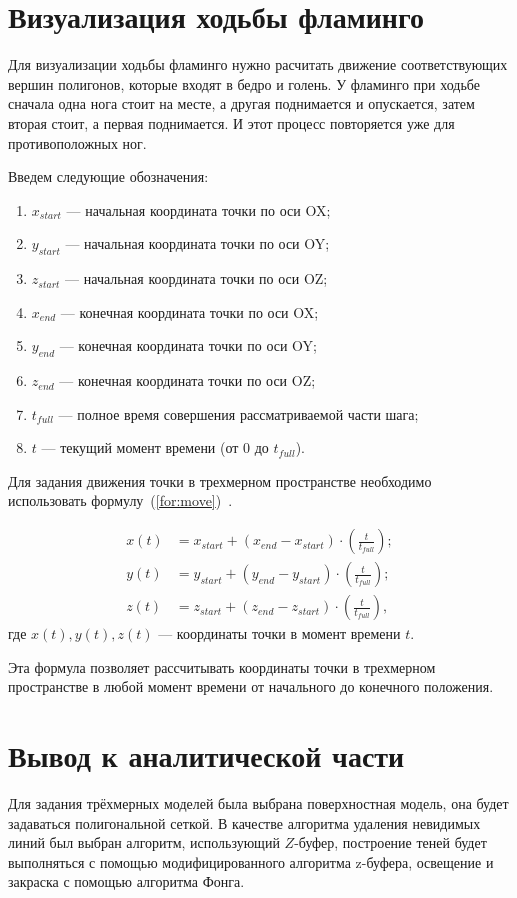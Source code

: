 \section{Визуализация ходьбы фламинго}

Для визуализации ходьбы фламинго нужно расчитать движение соответствующих вершин полигонов, которые входят в бедро и голень. 
У фламинго при ходьбе сначала одна нога стоит на месте, а другая поднимается и опускается, затем вторая стоит, а первая поднимается.
И этот процесс повторяется уже для противоположных ног. 

Введем следующие обозначения:
\begin{enumerate}[label=\arabic*)]
	\item $x_{start}$ --- начальная координата точки по оси OX;
	\item $y_{start}$ --- начальная координата точки по оси OY;
	\item $z_{start}$ --- начальная координата точки по оси OZ;
	\item $x_{end}$ --- конечная координата точки по оси OX;
	\item $y_{end}$ --- конечная координата точки по оси OY;
	\item $z_{end}$ --- конечная координата точки по оси OZ;
	\item $t_{full}$ --- полное время совершения рассматриваемой части шага;
	\item $t$ --- текущий момент времени (от 0 до $t_{full}$).
\end{enumerate}


Для задания движения точки в трехмерном пространстве необходимо использовать формулу~(\ref{for:move})~\cite{angem}.

\begin{equation} 
	\label{for:move}
\begin{align*}
	x(t) &= x_{start} + (x_{end} - x_{start}) \cdot \left(\frac{t}{{t_{full}}}\right); \\
	y(t) &= y_{start} + (y_{end} - y_{start}) \cdot \left(\frac{t}{{t_{full}}}\right); \\
	z(t) &= z_{start} + (z_{end} - z_{start}) \cdot \left(\frac{t}{{t_{full}}}\right),
\end{align*}
\end{equation}
где $x(t), y(t), z(t)$ --- координаты точки в момент времени $t$.


Эта формула позволяет рассчитывать координаты точки в трехмерном пространстве в любой момент времени от начального до конечного положения.

\section{Вывод к аналитической части} 

Для задания трёхмерных моделей была выбрана поверхностная модель, она будет задаваться полигональной сеткой. В качестве алгоритма удаления невидимых линий был выбран алгоритм, использующий $Z$-буфер, построение теней будет выполняться с помощью модифицированного алгоритма z-буфера, освещение и закраска с помощью алгоритма Фонга.

